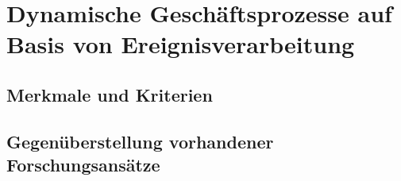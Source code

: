\section{Dynamische Geschäftsprozesse auf Basis von Ereignisverarbeitung}

\subsection{Merkmale und Kriterien}

\subsection{Gegenüberstellung vorhandener Forschungsansätze}